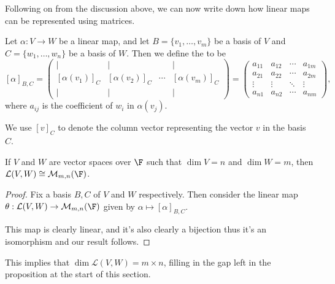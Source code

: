 Following on from the discussion above, we can now write down how linear maps can be represented using matrices.

\begin{definition}
    Let $\alpha: V \rightarrow W$ be a linear map, and let $B = \{v_1, \dots, v_m\}$ be a basis of $V$ and $C = \{w_1, \dots, w_n\}$ be a basis of $W$. Then we define the  to be
    $$
    [\alpha]_{B, C} = \begin{pmatrix}
        | & | & & | \\
        [\alpha(v_1)]_C & [\alpha(v_2)]_C & \cdots & [\alpha(v_m)]_C \\
        | & | & & |
    \end{pmatrix} = \begin{pmatrix}
        a_{11} & a_{12} & \cdots & a_{1m} \\
        a_{21} & a_{22} & \cdots & a_{2m} \\
        \vdots&\vdots&\ddots &\vdots\\
        a_{n1} & a_{n2} & \cdots & a_{nm}
    \end{pmatrix},
    $$
    where $a_{ij}$ is the coefficient of $w_i$ in $\alpha(v_j)$.
\end{definition}
\begin{remark}[Notation]
    We use $[v]_C$ to denote the column vector representing the vector $v$ in the basis $C$.
\end{remark}


\begin{proposition}
    If $V$ and $W$ are vector spaces over $\F$ such that $\dim V = n$ and $\dim W = m$, then $\mathcal{L}(V, W) \cong \mathcal{M}_{m, n}(\F)$.
\end{proposition}
\begin{proof}
    Fix a basis $B, C$ of $V$ and $W$ respectively.
    Then consider the linear map
    $
    \theta: \mathcal{L}(V, W) \rightarrow \mathcal{M}_{m, n}(\F)
    $ given by $\alpha \mapsto [\alpha]_{B, C}$.

    This map is clearly linear, and it's also clearly a bijection thus it's an isomorphism and our result follows.
\end{proof}

\begin{remark}
    This implies that $\dim \mathcal{L}(V, W) = m \times n$, filling in the gap left in the proposition at the start of this section.
\end{remark}


